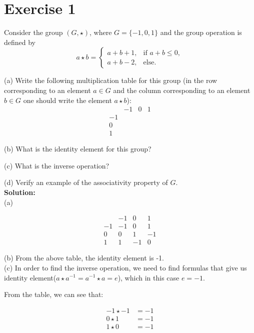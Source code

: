 \documentclass{article}
\begin{document}
\section*{Exercise 1}

Consider the group $(G,\star)$, where $G=\{-1,0,1\}$ and the group operation is defined by
\[
a \star b = \begin{cases}
a + b + 1, & \text{if } a + b \leq 0, \\
a + b - 2, & \text{else.}
\end{cases}
\]

(a) Write the following multiplication table for this group (in the row corresponding to an element $a \in G$ and the column corresponding to an element $b \in G$ one should write the element $a \star b$):
\[
\begin{array}{c|ccc}
& -1 & 0 & 1 \\
\hline
-1 & & & \\
0 & & & \\
1 & & & 
\end{array}
\]

(b) What is the identity element for this group?

(c) What is the inverse operation?

(d) Verify an example of the associativity property of $G$.\\

\textbf{Solution:}\\

(a)

\[
\begin{array}{c|ccc}
& -1 & 0 & 1 \\
\hline
-1 & -1 & 0 & 1\\
0 & 0 & 1 & -1\\
1 & 1 & -1 & 0
\end{array}
\]

(b) From the above table, the identity element is -1. \\

(c) In order to find the inverse operation, we need to find formulas that give us identity element($a \star a^{-1} = a^{-1} \star a = e$), which in this case $e = -1$.

From the table, we can see that:

\begin{align*}
-1 \star -1 &= -1 \\
0 \star 1 &= -1 \\
1 \star 0 &= -1
\end{align*}
\end{document}
